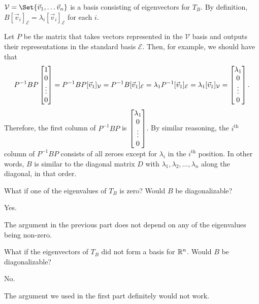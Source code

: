 \documentclass{workbook}
\begin{document}
\begin{slide}
\begin{parts}
\begin{solution}
			$\mathcal V=\Set{\vec v_1,\ldots \vec v_n}$ is a basis consisting
			of eigenvectors for $T_B$. By definition, $B[\vec v_i]_{\mathcal E}=\lambda_i[\vec v_i]_{\mathcal E}$
			for each $i$.

			Let $P$ be the matrix that takes vectors represented in the
			$\mathcal V$ basis and outputs their representations in the standard
			basis $\mathcal E$. Then, for example, we should have that
			\[
				P^{-1}BP\begin{bmatrix}1\\0\\\vdots\\0\end{bmatrix}
				=P^{-1}BP[\vec v_1]_{\mathcal V}
				=P^{-1}B[\vec v_1]_{\mathcal E}
				=\lambda_1P^{-1}[\vec v_1]_{\mathcal E}
				=\lambda_1[\vec v_1]_{\mathcal V}
				=\begin{bmatrix}\lambda_1\\0\\\vdots\\0\end{bmatrix}.
			\]
			Therefore, the first column of $P^{-1}BP$ is $\begin{bmatrix}\lambda_1\\0\\\vdots\\0\end{bmatrix}$.
			By similar reasoning, the $i^{\text{th}}$ column of $P^{-1}BP$ consists
			of all zeroes except for $\lambda_i$ in the $i^{\text{th}}$ position.
			In other words, $B$ is similar to the diagonal matrix $D$ with
			$\lambda_1, \lambda_2, \dots, \lambda_n$ along the diagonal, in that
			order.
		\end{solution}
		\item What if one of the eigenvalues of $T_B$ is zero?  Would $B$ be diagonalizable?
			\begin{solution}
				Yes.

				The argument in the previous part does not depend on any of the
				eigenvalues being non-zero.
			\end{solution}
		\item What if the eigenvectors of $T_B$ did not form a basis for $\mathbb{R}^n$.
			Would $B$ be diagonalizable?
			\begin{solution}
				No.

				The argument we used in the first part definitely would not work.


\end{solution}
\end{parts}
\end{slide}
\end{document}
